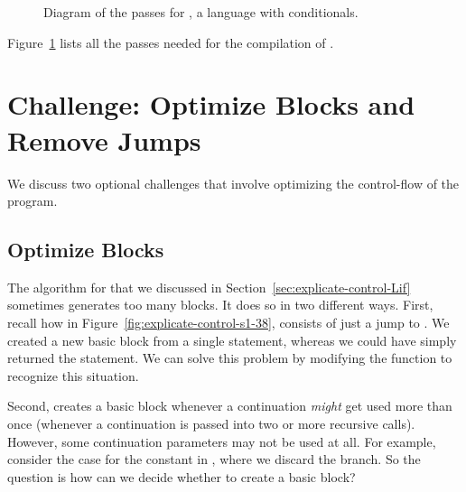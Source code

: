 \documentclass[7x10]{TimesAPriori_MIT}%
\begin{document}
\begin{figure}[tbp]
{
\fi}
\caption{Diagram of the passes for \LangIf{}, a language with conditionals.}
 \label{fig:Lif-passes}
\end{figure}

Figure~\ref{fig:Lif-passes} lists all the passes needed for the
compilation of \LangIf{}.


\section{Challenge: Optimize Blocks and Remove Jumps}
\label{sec:opt-jumps}

We discuss two optional challenges that involve optimizing the
control-flow of the program.

\subsection{Optimize Blocks}

The algorithm for  that we discussed in
Section~\ref{sec:explicate-control-Lif} sometimes generates too many
blocks. It does so in two different ways.
%
First, recall how in Figure~\ref{fig:explicate-control-s1-38},
 consists of just a jump to . We created
a new basic block from a single  statement, whereas we
could have simply returned the  statement. We can solve
this problem by modifying the  function to
recognize this situation.

Second,  creates a basic block whenever a
continuation \emph{might} get used more than once (whenever a
continuation is passed into two or more recursive calls). However,
some continuation parameters may not be used at all. For example, consider the
case for the constant \TRUE{} in , where we
discard the  branch.  So the question is how can we decide
whether to create a basic block?
\end{document}
